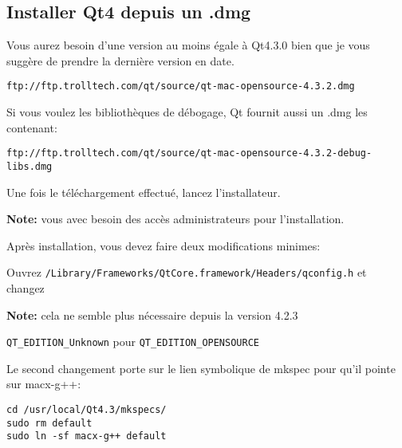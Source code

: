 \subsection{Installer Qt4 depuis un .dmg}
Vous aurez besoin d'une version au moins \'egale \`a Qt4.3.0 bien que je vous sugg\`ere de prendre la derni\`ere version en date.

\begin{verbatim}
ftp://ftp.trolltech.com/qt/source/qt-mac-opensource-4.3.2.dmg
\end{verbatim}

Si vous voulez les biblioth\`eques de d\'ebogage, Qt fournit aussi un .dmg les contenant:

\begin{verbatim}
ftp://ftp.trolltech.com/qt/source/qt-mac-opensource-4.3.2-debug-libs.dmg
\end{verbatim}

Une fois le t\'el\'echargement effectu\'e, lancez l'installateur.

% 
% 
% 
% 
% 
% 

\textbf{Note:} vous avec besoin des acc\`es administrateurs pour l'installation.

Apr\`es installation, vous devez faire deux modifications minimes:

Ouvrez \texttt{/Library/Frameworks/QtCore.framework/Headers/qconfig.h} et changez

\textbf{Note:} cela ne semble plus n\'ecessaire depuis la version 4.2.3

\texttt{QT\_EDITION\_Unknown} pour \texttt{QT\_EDITION\_OPENSOURCE}

Le second changement porte sur le lien symbolique de mkspec pour qu'il pointe sur macx-g++:

\begin{verbatim}
cd /usr/local/Qt4.3/mkspecs/ 
sudo rm default 
sudo ln -sf macx-g++ default
\end{verbatim}

